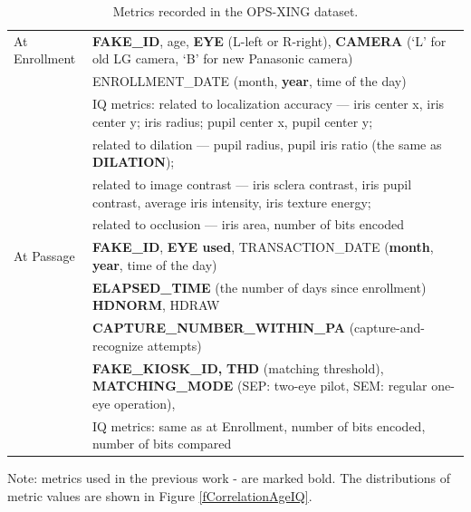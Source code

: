 \documentclass{cta-author}%
\begin{document}
\begin{table}[!t]
	\caption{Metrics recorded in the OPS-XING dataset. 	
	\label{MetricsRecordedAtOPSXINGDataSet}}


\begin{small}

		\begin{tabular} { l | l }
		\hline
			At Enrollment & 
			\textbf{FAKE\_ID}, age, %
\textbf{EYE} (L-left or R-right), 
\textbf{CAMERA }(`L' for old LG camera, `B' for new Panasonic camera) \\ 
& ENROLLMENT\_DATE (month, \textbf{year}, time of the day)
\\ 
& IQ metrics:  related to localization accuracy --- 
			iris center x,   iris center y; 			 iris radius; 	pupil center x,  pupil center y; 
			\\ 			& 
\quad related to dilation ---  
pupil radius,   
pupil iris ratio  (the same as \textbf{DILATION});		
			\\ 			& 		
\quad related to image contrast --- 
iris sclera contrast,
	iris pupil contrast, 
	average iris intensity, 
	iris texture energy;    
			\\ 			& 
\quad related to  occlusion --- 
iris area,     
	number of bits encoded   
\\ \hline
				At Passage & 
				\textbf{FAKE\_ID},
\textbf{EYE used},
TRANSACTION\_DATE (\textbf{month}, \textbf{year}, time of the day) \\ 			& 
\textbf{ELAPSED\_TIME} (the number of days since enrollment) 
\textbf{HDNORM}, HDRAW 
		\\ 			& 
\textbf{CAPTURE\_NUMBER\_WITHIN\_PA} (capture-and-recognize attempts)
			\\ 			& 
\textbf{FAKE\_KIOSK\_ID,}
\textbf{THD} (matching threshold), 	
\textbf{MATCHING\_MODE} (SEP: two-eye pilot, SEM: regular one-eye operation), 
							\\ 			& 
				IQ metrics: same as at Enrollment,
				number of bits encoded, number of bits compared 
				\\	
				\hline
		\end{tabular}

{\footnotesize
Note: metrics used in the previous work \cite{irexVI}-\cite{Bowyer-BTAS2016} are marked bold.
The distributions of metric  values are shown in  Figure \ref{fCorrelationAgeIQ}.
}

	\end{small}
\end{table}
\end{document}
